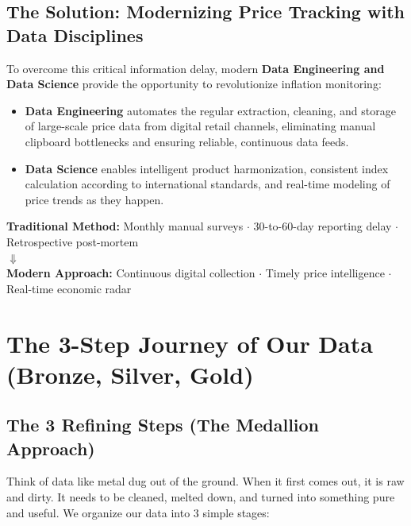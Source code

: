 \documentclass[11pt,a4paper,oneside]{article}
\begin{document}
\subsection{The Solution: Modernizing Price Tracking with Data Disciplines}
To overcome this critical information delay, modern \textbf{Data Engineering and Data Science} provide the opportunity to revolutionize inflation monitoring:
\begin{itemize}
    \item \textbf{Data Engineering} automates the regular extraction, cleaning, and storage of large-scale price data from digital retail channels, eliminating manual clipboard bottlenecks and ensuring reliable, continuous data feeds.
    \item \textbf{Data Science} enables intelligent product harmonization, consistent index calculation according to international standards, and real-time modeling of price trends as they happen.
\end{itemize}

\begin{tcolorbox}[colback=white,colframe=NavyBlue,title=\bfseries Core Impact: Modernizing Price Measurement]
\centering
\textbf{Traditional Method:} Monthly manual surveys $\cdot$ 30-to-60-day reporting delay $\cdot$ Retrospective post-mortem \\
$\Downarrow$ \\
\textbf{Modern Approach:} Continuous digital collection $\cdot$ Timely price intelligence $\cdot$ Real-time economic radar
\end{tcolorbox}

\newpage

\section{The 3-Step Journey of Our Data (Bronze, Silver, Gold)}

\subsection{The 3 Refining Steps (The Medallion Approach)}
Think of data like metal dug out of the ground. When it first comes out, it is raw and dirty. It needs to be cleaned, melted down, and turned into something pure and useful. We organize our data into 3 simple stages:
\end{document}
